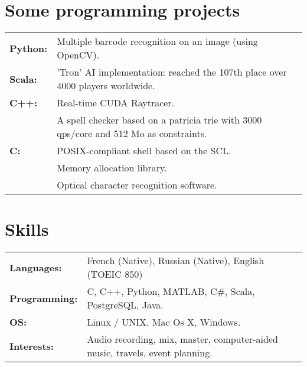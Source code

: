 \documentclass[11pt,a4paper,sans]{moderncv}
\begin{document}
\section{Some programming projects}
\setlength{\tabcolsep}{3pt}
\renewcommand{\arraystretch}{1.2}
\begin{tabular}{ll}
\textbf{Python:} & Multiple barcode recognition on an image (using OpenCV).\\
\textbf{Scala:} & 'Tron' AI implementation: reached the 107th place over 4000 players worldwide.\\
\textbf{C++:} & Real-time CUDA Raytracer.\\
&A spell checker based on a patricia trie with 3000 qps/core and 512 Mo as constraints.\\
\textbf{C:} & POSIX-compliant shell based on the SCL.\\
&Memory allocation library.\\
&Optical character recognition software.
\end{tabular}

\section{Skills}
\setlength{\tabcolsep}{3pt}
\renewcommand{\arraystretch}{1.2}
\begin{tabular}{ll}
\textbf{Languages:} & French (Native), Russian (Native), English (TOEIC 850)\\
\textbf{Programming:} & C, C++, Python, MATLAB, C\#, Scala, PostgreSQL, Java.\\
\textbf{OS:} & Linux / UNIX, Mac Os X, Windows.\\
\textbf{Interests:} & Audio recording, mix, master, computer-aided music, travels, event planning.
\end{tabular}
\end{document}
